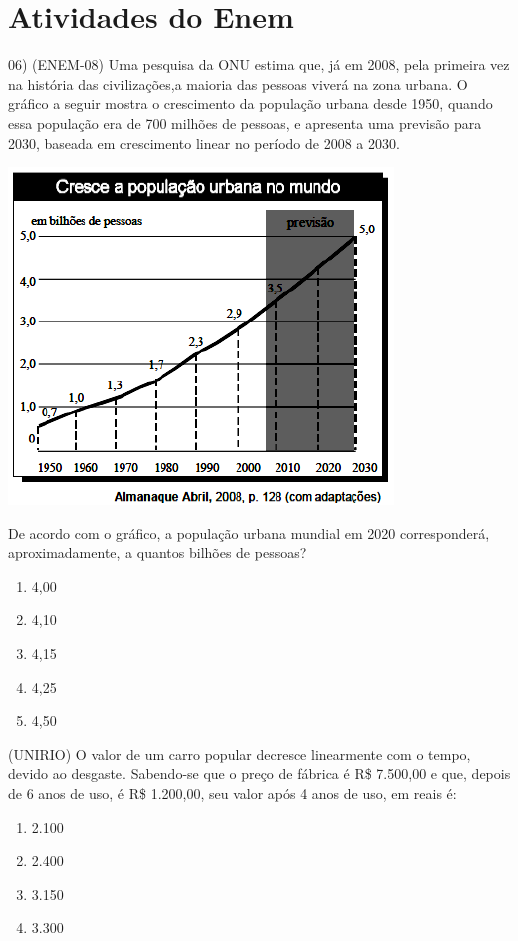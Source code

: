 					 	
		\section{Atividades do Enem}				
				
				\item 06) (ENEM-08) Uma pesquisa da ONU estima que, já em 2008, pela primeira vez na história das civilizações,a maioria das pessoas viverá na zona urbana. O gráfico a seguir mostra o crescimento da população urbana desde 1950, quando essa população era de 700 milhões de pessoas, e apresenta uma previsão para 2030, baseada em crescimento linear no período de 2008 a 2030.			
				\begin{center}
				\includegraphics[scale=0.8]{figuras/fig14}
				\end{center}
	De acordo com o gráfico, a população urbana mundial em 2020 corresponderá, aproximadamente, a quantos bilhões de pessoas?
				\begin{multicols}{5}
				\begin{enumerate}
					\item 4,00
					\item 4,10
					\item 4,15
					\item 4,25 
					\item 4,50
				\end{enumerate}
				\end{multicols}
				
				\item (UNIRIO) O valor de um carro popular decresce linearmente com o tempo, devido ao desgaste. Sabendo-se que o preço de fábrica é R\$ 7.500,00 e que, depois de 6 anos de uso, é R\$ 1.200,00, seu valor após 4 anos de uso, em reais é:
				\begin{multicols}{4}
				\begin{enumerate}
					\item 2.100
					\item 2.400
					\item 3.150
					\item 3.300 					 
				\end{enumerate}
				\end{multicols}
				
